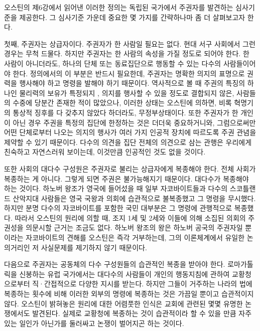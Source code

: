 오스틴의 제6강에서 읽어낸 이러한 정의는 독립된 국가에서 주권자를 발견하는
심사기준을 제공한다.
그 심사기준 가운데 중요한 몇 가지를 간략하나마 좀 더 살펴보고자 한다.

첫째, 주권자는  상급자이다.
주권자가 한 사람일 필요는 없다.
현대 서구 사회에서 그런 경우는 무척 드물다.
하지만 주권자는 한 사람의 속성을 가질 정도로 되어야 한다.
한 사람이 아니더라도,
하나의 단체 또는 동료집단으로 행동할 수 있는 다수의 사람들이어야 한다.
정의에서의 이 부분은 반드시 필요한데,
주권자는 명확한 의지의 표명으로
권력을 행사해야 하고 명령을 발해야 하기 때문이다.
역사적으로 볼 때
주권의 특징의 하나인 물리력의 보유가
특정되지 , 의지를 행사할 수 있을 정도로 결합되지 않은,
사람들의 수중에 당분간 존재한 적이 많았으나,
이러한 상태는 오스틴에 의하면, 비록 혁명기의 통상적 징후를 다 갖추지
않았다 하더라도, 무정부상태이다.
또한
주권자가 한 개인이 아닌 경우 주권을 특정의 집단에 한정하는 것은
더더욱 중요하거니와,
그럼으로써만 어떤 단체로부터 나오는 의지의 행사가 여러 가지 인공적 장치에
따르도록 주권 관념을 제약할 수 있기 때문이다.
다수의 의견을 집단 전체의 의견으로 삼는 관행은 우리에게 친숙하고 자연스러워
보이는데, 이것만큼 인공적인 것도 없을 것이다.

또한 사회의 대다수 구성원은 주권자로 불리는 상급자에게 복종해야 한다.
전체 사회가 복종하는 게 아니다. 그렇게 되면 주권은 불가능해지기 때문이다.
대다수가 복종해야 하는 것이다.
하노버 왕조가 영국에 들어섰을 때
일부 자코바이트들과
다수의 스코틀랜드 산악지대 사람들은
영국 국왕과 의회에 습관적으로 불복종했고 그 명령을 무시했다.
하지만 분명 다수의 자코바이트를 포함한 국민 대부분은 그 명령에 관행적으로
복종했다.
따라서 오스틴의 원리에 의할 때,
조지 1세 및 2세와 이들에 의해 소집된 의회의 주권성을 의문시할
근거는 조금도 없다.
하노버 왕조의 왕은 하노버 공국의 주권자일 뿐이라는
자코바이트의 견해를 오스틴은 즉각 거부하는데,
그의 이론체계에서 유일한 논의거리인 저 사실문제를 제기하지 않기 때문이다.

다음으로
주권자는 공동체의 다수 구성원들의 습관적인 복종을 받아야 한다.
로마가톨릭을 신봉하는 유럽 국가에서는 대다수의 사람들이
개인의 행동지침에 관하여
교황청으로부터
직·간접적으로 다양한 지시를 받는다.
하지만 그들이 거주하는 나라의 법에 복종하는 횟수에 비해
이러한 외부의 명령에 복종하는 것은 가끔일 뿐이고 습관적이지 않다.
오스틴이 밝혀놓은 원리에 대한 어렴풋한 인식은
교회에 관련된 몇몇 유명한 논쟁에서도 발견된다.
실제로 교황청에 복종하는 것이
습관적이라 할 수 있을 만큼 자주 있는 일인가 아닌가를 둘러싸고 논쟁이
벌어지곤 하는 것이다.

